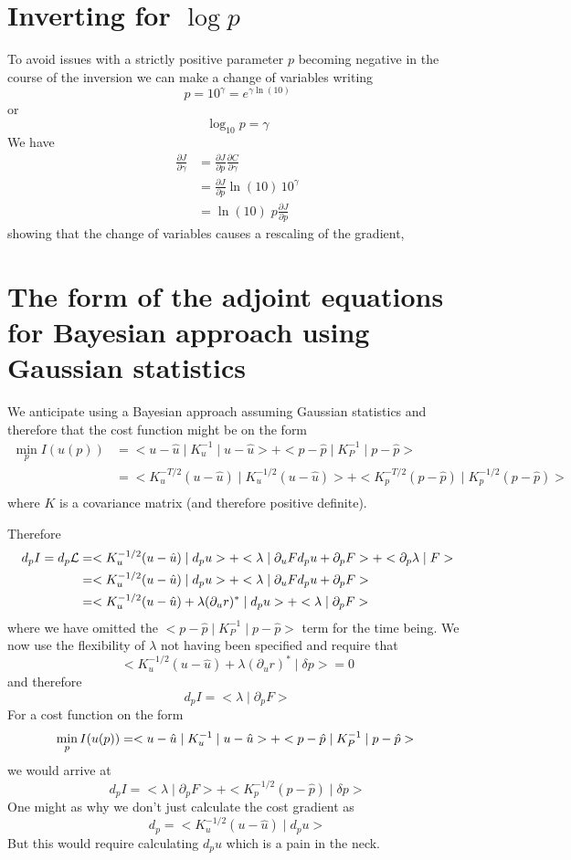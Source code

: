 \documentclass[10pt,a4paper]{book}
\newcommand{\p}{\partial}
\begin{document}
\section{Inverting for $\log p$}
To avoid issues with a strictly positive parameter $p$ becoming
negative in the course of the inversion we can make a change of
variables writing
\[
 p= 10^{\gamma} = e^{\gamma \ln(10)}
\]
or
\[
\log_{10} p =\gamma
\]
We have
\begin{align*}
 \frac{\p J}{\p \gamma} & = \frac{\p J}{\p p}  \frac{\p C}{\p \gamma} \\
                        & = \frac{\p J}{\p p}  \ln(10)  \, 10^{\gamma} \\
                        & = \ln(10) \; p \frac{\p J}{\p p}
\end{align*}
showing that the change of variables causes a rescaling of the gradient,


\section{The form of the adjoint equations for Bayesian approach using Gaussian statistics}

We anticipate using a Bayesian approach assuming Gaussian statistics
and therefore that the cost function might be on the form
\begin{align*}
  \min_{p} I(u(p))
  &= < u -\hat{u} \mid K_u^{-1} \mid u -\hat{u} > + < p -\hat{p} \mid K_P^{-1} \mid p -\hat{p} >  \\
  &= < K_u^{-T/2}  (u -\hat{u}) \mid K_u^{-1/2} ( u -\hat{u} )> + < K_p^{-T/2}  (p -\hat{p}) \mid K_p^{-1/2} ( p -\hat{p} )>\\
\end{align*}
where $K$ is a covariance matrix (and therefore positive definite).

Therefore
\begin{align*}
  d_p I=d_p \cal{L}
  &=  <K_u^{-1/2} (u-\hat{u} ) \mid d_p u > +  <\lambda \mid \p_u F d_p u + \p_p F > + < \p_p \lambda \mid F >\\
  &=  <K_u^{-1/2} (u-\hat{u} ) \mid d_p u > +  <\lambda \mid \p_u F d_p u + \p_p F > \\
  &= < K_u^{-1/2} (u-\hat{u} ) + \lambda (\p_u r)^\ast \mid d_p u > + <\lambda \mid  \p_p F > 
\end{align*}
where we have omitted the $ < p -\hat{p} \mid K_P^{-1} \mid p -\hat{p} > $ term for the time being.
We now use the flexibility of $\lambda$ not having been specified and require that
\[
 < K_u^{-1/2} (u-\hat{u} ) + \lambda (\p_u r)^\ast \mid \delta p >  =0 
\]
and therefore
\[
d_p I = < \lambda \mid \p_p F >
\]
For a cost function on the form
\[
\min_{p} I(u(p)) = < u -\hat{u} \mid K_u^{-1} \mid u -\hat{u} > + < p -\hat{p} \mid K_P^{-1} \mid p -\hat{p} >  \\
\]
we would arrive at 
\[
d_p I = < \lambda \mid \p_p F > + <K_p^{-1/2} (p-\hat{p} ) \mid \delta p > 
\]
One might as why we don't just calculate the cost gradient as
\[
d_p =  <K_u^{-1/2} (u-\hat{u} ) \mid d_p u > 
\]
But this would require calculating  $d_p u$ which is a pain in the neck.
\end{document}
